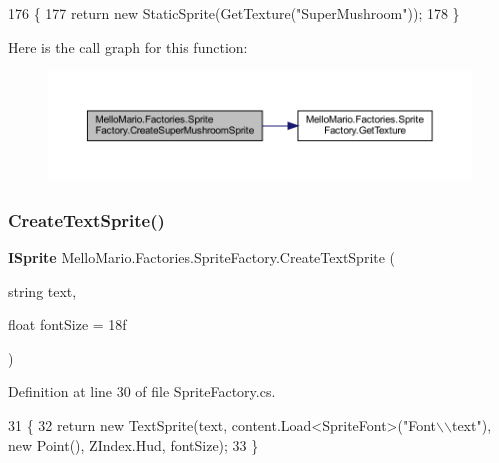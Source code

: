 \begin{DoxyCode}
176         \{
177             \textcolor{keywordflow}{return} \textcolor{keyword}{new} StaticSprite(GetTexture(\textcolor{stringliteral}{"SuperMushroom"}));
178         \}
\end{DoxyCode}
Here is the call graph for this function\+:
\nopagebreak
\begin{figure}[H]
\begin{center}
\leavevmode
\includegraphics[width=350pt]{classMelloMario_1_1Factories_1_1SpriteFactory_a99d20b598b1ddf39d02a7354721a4bcf_cgraph}
\end{center}
\end{figure}
\mbox{\label{classMelloMario_1_1Factories_1_1SpriteFactory_a8b16d8c39377823f1f011c074ab6b270}} 
\subsubsection{Create\+Text\+Sprite()}
{\footnotesize\ttfamily \textbf{ I\+Sprite} Mello\+Mario.\+Factories.\+Sprite\+Factory.\+Create\+Text\+Sprite (\begin{DoxyParamCaption}\item[{string}]{text,  }\item[{float}]{font\+Size = {\ttfamily 18f} }\end{DoxyParamCaption})}



Definition at line 30 of file Sprite\+Factory.\+cs.


\begin{DoxyCode}
31         \{
32             \textcolor{keywordflow}{return} \textcolor{keyword}{new} TextSprite(text, content.Load<SpriteFont>(\textcolor{stringliteral}{"Font\(\backslash\)\(\backslash\)text"}), \textcolor{keyword}{new} Point(), 
      ZIndex.Hud, fontSize);
33         \}
\end{DoxyCode}
\mbox{\label{classMelloMario_1_1Factories_1_1SpriteFactory_ab0a7ed9dbba09c7ecbc036ac65a4a109}} 
